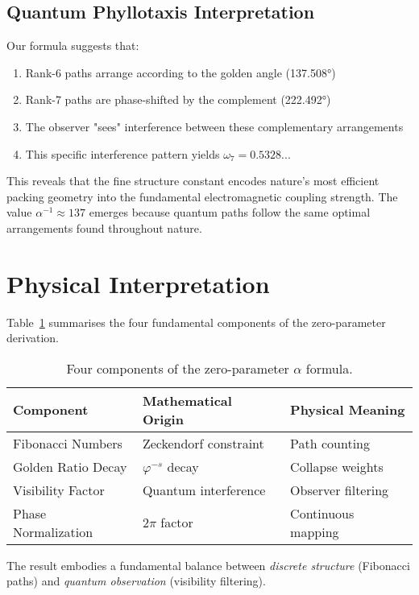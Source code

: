 \documentclass[%
 reprint,
 amsmath,amssymb,
 aps,
 prd,
 10pt,
 nofootinbib,      %
 longbibliography  %
]{revtex4-2}
\theoremstyle{definition}
\theoremstyle{remark}
\begin{document}
\subsection{Quantum Phyllotaxis Interpretation}

Our formula suggests that:
\begin{enumerate}
\item Rank-6 paths arrange according to the golden angle (137.508°)
\item Rank-7 paths are phase-shifted by the complement (222.492°)
\item The observer "sees" interference between these complementary arrangements
\item This specific interference pattern yields $\omega_7 = 0.5328...$
\end{enumerate}

This reveals that the fine structure constant encodes nature's most efficient packing geometry into the fundamental electromagnetic coupling strength. The value $\alpha^{-1} \approx 137$ emerges because quantum paths follow the same optimal arrangements found throughout nature.

\section{Physical Interpretation}\label{sec:interpretation}

Table~\ref{tab:contributions}
summarises the four fundamental components of the zero-parameter derivation.
\begin{table}[h!]
  \centering
  \small
  \begin{tabular}{lll}
    \toprule
    Component & Mathematical Origin & Physical Meaning \\
    \midrule
    Fibonacci Numbers & Zeckendorf constraint & Path counting \\
    Golden Ratio Decay & $\varphi^{-s}$ decay & Collapse weights \\
    Visibility Factor & Quantum interference & Observer filtering \\
    Phase Normalization & $2\pi$ factor & Continuous mapping \\
    \bottomrule
  \end{tabular}
  \caption{Four components of the zero-parameter $\alpha$ formula.}
  \label{tab:contributions}
\end{table}

The result embodies a fundamental balance between
\emph{discrete structure} (Fibonacci paths) and
\emph{quantum observation} (visibility filtering).
\end{document}
